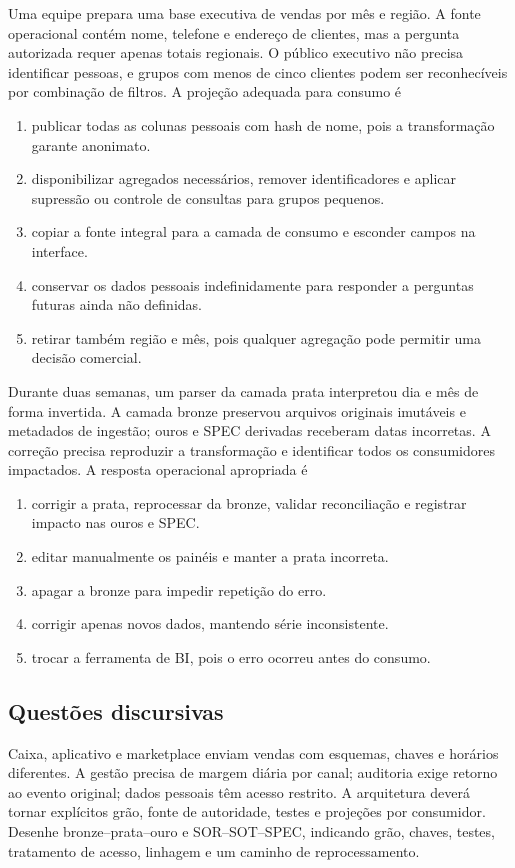 \TextoBase Uma equipe prepara uma base executiva de vendas por mês e região. A fonte operacional contém nome, telefone e endereço de clientes, mas a pergunta autorizada requer apenas totais regionais. O público executivo não precisa identificar pessoas, e grupos com menos de cinco clientes podem ser reconhecíveis por combinação de filtros.
\FonteDidatica
\Comando A projeção adequada para consumo é
\begin{enumerate}[label=\Alph*)]
\item publicar todas as colunas pessoais com hash de nome, pois a transformação garante anonimato.
\item disponibilizar agregados necessários, remover identificadores e aplicar supressão ou controle de consultas para grupos pequenos.
\item copiar a fonte integral para a camada de consumo e esconder campos na interface.
\item conservar os dados pessoais indefinidamente para responder a perguntas futuras ainda não definidas.
\item retirar também região e mês, pois qualquer agregação pode permitir uma decisão comercial.
\end{enumerate}
\TextoBase Durante duas semanas, um parser da camada prata interpretou dia e mês de forma invertida. A camada bronze preservou arquivos originais imutáveis e metadados de ingestão; ouros e SPEC derivadas receberam datas incorretas. A correção precisa reproduzir a transformação e identificar todos os consumidores impactados.
\FonteDidatica
\Comando A resposta operacional apropriada é
\begin{enumerate}[label=\Alph*)]\item corrigir a prata, reprocessar da bronze, validar reconciliação e registrar impacto nas ouros e SPEC.\item editar manualmente os painéis e manter a prata incorreta.\item apagar a bronze para impedir repetição do erro.\item corrigir apenas novos dados, mantendo série inconsistente.\item trocar a ferramenta de BI, pois o erro ocorreu antes do consumo.
\end{enumerate}

\subsection{Questões discursivas}
\TextoBase Caixa, aplicativo e marketplace enviam vendas com esquemas, chaves e horários diferentes. A gestão precisa de margem diária por canal; auditoria exige retorno ao evento original; dados pessoais têm acesso restrito. A arquitetura deverá tornar explícitos grão, fonte de autoridade, testes e projeções por consumidor.
\FonteDidatica
\Comando Desenhe bronze--prata--ouro e SOR--SOT--SPEC, indicando grão, chaves, testes, tratamento de acesso, linhagem e um caminho de reprocessamento.

